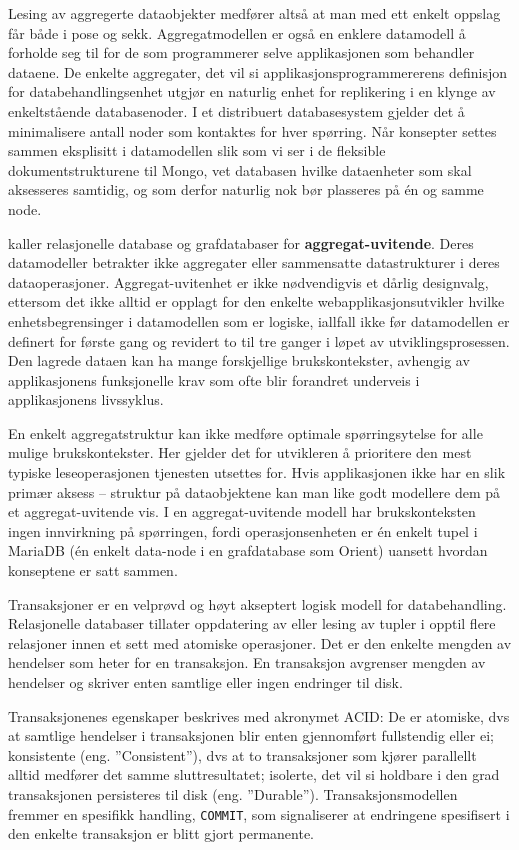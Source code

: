 Lesing av aggregerte dataobjekter medfører altså at man med ett enkelt oppslag får både i pose og sekk. Aggregatmodellen er også en enklere datamodell å forholde seg til for de som programmerer selve applikasjonen som behandler dataene. De enkelte aggregater, det vil si applikasjonsprogrammererens definisjon for databehandlingsenhet utgjør en naturlig enhet for replikering i en klynge av enkeltstående databasenoder. I et distribuert databasesystem gjelder det å minimalisere antall noder som kontaktes for hver spørring. Når konsepter settes sammen eksplisitt i datamodellen slik som vi ser i de fleksible dokumentstrukturene til Mongo, vet databasen hvilke dataenheter som skal aksesseres samtidig, og som derfor naturlig nok bør plasseres på én og samme node.

\cite{sadalage2013} kaller relasjonelle database og grafdatabaser for \textbf{aggregat-uvitende}. Deres datamodeller betrakter ikke aggregater eller sammensatte datastrukturer i deres dataoperasjoner. Aggregat-uvitenhet er ikke nødvendigvis et dårlig designvalg, ettersom det ikke alltid er opplagt for den enkelte webapplikasjonsutvikler hvilke enhetsbegrensinger i datamodellen som er logiske, iallfall ikke før datamodellen er definert for første gang og revidert to til tre ganger i løpet av utviklingsprosessen. Den lagrede dataen kan ha mange forskjellige brukskontekster, avhengig av applikasjonens funksjonelle krav som ofte blir forandret underveis i applikasjonens livssyklus.

En enkelt aggregatstruktur kan ikke medføre optimale spørringsytelse for alle mulige brukskontekster. Her gjelder det for utvikleren å prioritere den mest typiske leseoperasjonen tjenesten utsettes for. Hvis applikasjonen ikke har en slik primær aksess – struktur på dataobjektene kan man like godt modellere dem på et aggregat-uvitende vis. I en aggregat-uvitende modell har brukskonteksten ingen innvirkning på spørringen, fordi operasjonsenheten er én enkelt tupel i MariaDB (én enkelt data-node i en grafdatabase som Orient) uansett hvordan konseptene er satt sammen.

Transaksjoner er en velprøvd og høyt akseptert logisk modell for databehandling. Relasjonelle databaser tillater oppdatering av eller lesing av tupler i opptil flere relasjoner innen et sett med atomiske operasjoner. Det er den enkelte mengden av hendelser som heter for en transaksjon. En transaksjon avgrenser mengden av hendelser og skriver enten samtlige eller ingen endringer til disk.

Transaksjonenes egenskaper beskrives med akronymet ACID: De er atomiske, dvs at samtlige hendelser i transaksjonen blir enten gjennomført fullstendig eller ei; konsistente (eng. ''Consistent''), dvs at to transaksjoner som kjører parallellt alltid medfører det samme sluttresultatet; isolerte, det vil si holdbare i den grad transaksjonen persisteres til disk (eng. ''Durable''). Transaksjonsmodellen fremmer en spesifikk handling, \texttt{COMMIT}, som signaliserer at endringene spesifisert i den enkelte transaksjon er blitt gjort permanente.

